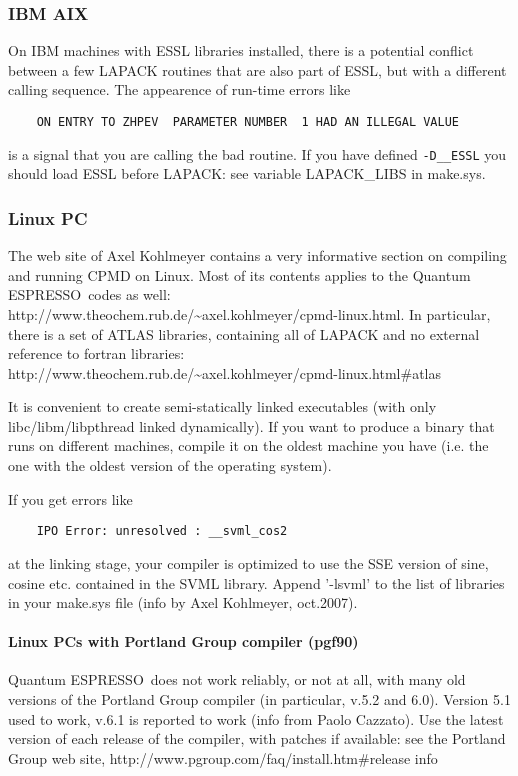 \documentclass[12pt,a4paper]{article}
\def\qe{{\sc Quantum ESPRESSO}}
\begin{document}
\subsubsection{IBM AIX}
On IBM machines with ESSL libraries installed, there is a 
potential conflict between a few LAPACK routines that are also part of ESSL, 
but with a different calling sequence. The appearence of run-time errors like
\begin{verbatim}
    ON ENTRY TO ZHPEV  PARAMETER NUMBER  1 HAD AN ILLEGAL VALUE
\end{verbatim}
is a signal that you are calling the bad routine. If you have defined 
\texttt{-D\_\_ESSL} you should load ESSL before LAPACK: see
variable LAPACK\_LIBS in make.sys.

\subsubsection{Linux PC}
The web site of Axel Kohlmeyer contains a very informative
section on compiling and running CPMD on Linux. Most of its contents
applies to the \qe\ codes as well:\\
http://www.theochem.rub.de/\~{}axel.kohlmeyer/cpmd-linux.html. In
particular, there is a set of ATLAS libraries, containing all of
LAPACK and no external reference to fortran libraries:\\
http://www.theochem.rub.de/\~{}axel.kohlmeyer/cpmd-linux.html\#atlas 
    
It is convenient to create semi-statically linked executables (with only
libc/libm/libpthread linked dynamically). If you want to produce a binary
that runs on different machines, compile it on the oldest machine you have
(i.e. the one with the oldest version of the operating system).

If you get errors like 
\begin{verbatim}
    IPO Error: unresolved : __svml_cos2
\end{verbatim}
at the linking stage, your compiler is optimized to use the SSE
version of sine, cosine etc. contained in the SVML library. Append
'-lsvml' to the list of libraries in your make.sys file (info by Axel
Kohlmeyer, oct.2007). 

\paragraph{Linux PCs with Portland Group compiler (pgf90)}
\qe\ does not work reliably, or not at all, with many old
versions of the Portland Group compiler (in particular, v.5.2 and
6.0). Version 5.1 used to work, v.6.1 is reported to work (info from
Paolo Cazzato). Use the latest version of each release of the
compiler, with patches if available: 
see the Portland Group web site,
http://www.pgroup.com/faq/install.htm\#release info
\end{document}
